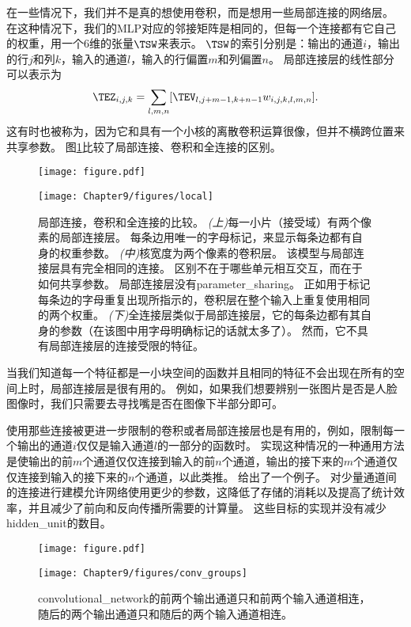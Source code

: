  

在一些情况下，我们并不是真的想使用卷积，而是想用一些局部连接的网络层\citep{LeCun86,LeCun89a}。
在这种情况下，我们的\gls{MLP}对应的邻接矩阵是相同的，但每一个连接都有它自己的权重，用一个6维的张量$\TSW$来表示。
$\TSW$的索引分别是：输出的通道$i$，输出的行$j$和列$k$，输入的通道$l$，输入的行偏置$m$和列偏置$n$。
局部连接层的线性部分可以表示为
\begin{equation}
\TEZ_{i,j,k} = \sum_{l,m,n} [\TEV_{l, j+m-1, k+n-1} w_{i, j, k, l, m, n}]. %
\end{equation}
这有时也被称为，因为它和具有一个小核的离散卷积运算很像，但并不横跨位置来共享参数。
图\ref{fig:chap9_local}比较了局部连接、卷积和全连接的区别。
\begin{figure}[!htb]
\ifOpenSource
\centerline{\texttt{[image: figure.pdf]}}
\else
\centerline{\texttt{[image: Chapter9/figures/local]}}
\fi
\caption{局部连接，卷积和全连接的比较。
\emph{(上)}每一小片（接受域）有两个像素的局部连接层。
每条边用唯一的字母标记，来显示每条边都有自身的权重参数。
\emph{(中)}核宽度为两个像素的卷积层。
该模型与局部连接层具有完全相同的连接。
区别不在于哪些单元相互交互，而在于如何共享参数。
局部连接层没有\gls{parameter_sharing}。
正如用于标记每条边的字母重复出现所指示的，卷积层在整个输入上重复使用相同的两个权重。
\emph{(下)}全连接层类似于局部连接层，它的每条边都有其自身的参数（在该图中用字母明确标记的话就太多了）。 然而，它不具有局部连接层的连接受限的特征。}
\label{fig:chap9_local}
\end{figure}
 
 
当我们知道每一个特征都是一小块空间的函数并且相同的特征不会出现在所有的空间上时，局部连接层是很有用的。
例如，如果我们想要辨别一张图片是否是人脸图像时，我们只需要去寻找嘴是否在图像下半部分即可。

使用那些连接被更进一步限制的卷积或者局部连接层也是有用的，例如，限制每一个输出的通道$i$仅仅是输入通道$l$的一部分的函数时。
实现这种情况的一种通用方法是使输出的前$m$个通道仅仅连接到输入的前$n$个通道，输出的接下来的$m$个通道仅仅连接到输入的接下来的$n$个通道，以此类推。
给出了一个例子。
对少量通道间的连接进行建模允许网络使用更少的参数，这降低了存储的消耗以及提高了统计效率，并且减少了前向和反向传播所需要的计算量。
这些目标的实现并没有减少\gls{hidden_unit}的数目。
\begin{figure}[!htb]
\ifOpenSource
\centerline{\texttt{[image: figure.pdf]}}
\else
\centerline{\texttt{[image: Chapter9/figures/conv\_groups]}}
\fi
\caption{\gls{convolutional_network}的前两个输出通道只和前两个输入通道相连，随后的两个输出通道只和随后的两个输入通道相连。}
\label{fig:chap9_conv_groups}
\end{figure}

